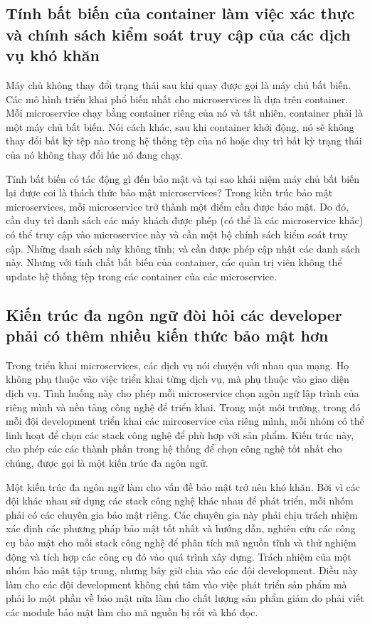 \documentclass[14pt,a4paper]{report}
\begin{document}
	\subsection{Tính bất biến của container làm việc xác thực và chính sách kiểm soát truy cập của các dịch vụ khó khăn}
	{\hspace{1cm}Máy chủ không thay đổi trạng thái sau khi quay được gọi là máy chủ bất biến. Các mô hình triển khai phổ biến nhất cho microservices là dựa trên container. Mỗi microservice chạy bằng container riêng của nó và tất nhiên, container phải là một máy chủ bất biến. Nói cách khác, sau khi container khởi động, nó sẽ không thay đổi bất kỳ tệp nào trong hệ thống tệp của nó hoặc duy trì bất kỳ trạng thái của nó không thay đổi lúc nó đang chạy.\\}
	
	\hspace{0.3cm}Tính bất biến có tác động gì đến bảo mật và tại sao khái niệm máy chủ bất biến lại được coi là thách thức bảo mật microservices? Trong kiến trúc bảo mật microservices, mỗi microservice trở thành một điểm cần được bảo mật. Do đó, cần duy trì danh sách các máy khách được phép (có thể là các microservice khác) có thể truy cập vào microservice này và cần một bộ chính sách kiểm soát truy cập. Những danh sách này không tĩnh; và cần được phép cập nhật các danh sách này. Nhưng với tính chất bất biến của container, các quản trị viên không thể update hệ thống tệp trong các container của các microservice.
	\subsection{Kiến trúc đa ngôn ngữ đòi hỏi các developer phải có thêm nhiều kiến thức bảo mật hơn}
	{\hspace{1cm}Trong triển khai microservices, các dịch vụ nói chuyện với nhau qua mạng. Họ không phụ thuộc vào việc triển khai từng dịch vụ, mà phụ thuộc vào giao diện dịch vụ. Tình huống này cho phép mỗi microservice chọn ngôn ngữ lập trình của riêng mình và nền tảng công nghệ để triển khai. Trong một môi trường, trong đó mỗi đội development triển khai các mircoservice của riêng mình, mỗi nhóm có thể linh hoạt để chọn các stack công nghệ để phù hợp với sản phẩm. Kiến trúc này, cho phép các các thành phần trong hệ thống để chọn công nghệ tốt nhất cho chúng, được gọi là một kiến trúc đa ngôn ngữ.\\}
	
	\hspace{0.3cm}Một kiến trúc đa ngôn ngữ làm cho vấn đề bảo mật trở nên khó khăn. Bởi vì các đội khác nhau sử dụng các stack công nghệ khác nhau để phát triển, mỗi nhóm phải có các chuyên gia bảo mật riêng. Các chuyên gia này phải chịu trách nhiệm xác định các phương pháp bảo mật tốt nhất và hướng dẫn, nghiên cứu các công cụ bảo mật cho mỗi stack công nghệ để phân tích mã nguồn tĩnh và thử nghiệm động và tích hợp các công cụ đó vào quá trình xây dựng. Trách nhiệm của một nhóm bảo mật tập trung, nhưng bây giờ chia vào các đội development. Điều này làm cho các đội development không chú tâm vào việc phát triển sản phẩm mà phải lo một phần về bảo mật nữa làm cho chất lượng sản phẩm giảm do phải viết các module bảo mật làm cho mã nguồn bị rối và khó đọc.
	
\end{document}
